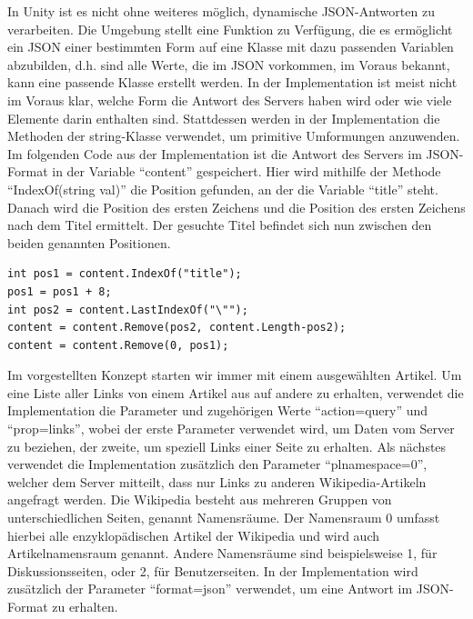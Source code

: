 \documentclass[12pt, a4paper]{article}
\begin{document}
In Unity ist es nicht ohne weiteres möglich, dynamische JSON-Antworten zu verarbeiten. Die Umgebung stellt eine Funktion zu Verfügung, die es ermöglicht ein JSON einer bestimmten Form auf eine Klasse mit dazu passenden Variablen abzubilden, d.h. sind alle Werte, die im JSON vorkommen, im Voraus bekannt, kann eine passende Klasse erstellt werden. In der Implementation ist meist nicht im Voraus klar, welche Form die Antwort des Servers haben wird oder wie viele Elemente darin enthalten sind. Stattdessen werden in der Implementation die Methoden der string-Klasse verwendet, um primitive Umformungen anzuwenden. Im folgenden Code aus der Implementation ist die Antwort des Servers im JSON-Format in der Variable "`content"' gespeichert. Hier wird mithilfe der Methode "`IndexOf(string val)"' die Position gefunden, an der die Variable "`title"' steht. Danach wird die Position des ersten Zeichens und die Position des ersten Zeichens nach dem Titel ermittelt. Der gesuchte Titel befindet sich nun zwischen den beiden genannten Positionen.
\begin{lstlisting}
int pos1 = content.IndexOf("title");
pos1 = pos1 + 8;
int pos2 = content.LastIndexOf("\"");
content = content.Remove(pos2, content.Length-pos2);
content = content.Remove(0, pos1);
\end{lstlisting}
Im vorgestellten Konzept starten wir immer mit einem ausgewählten Artikel. Um eine Liste aller Links von einem Artikel aus auf andere zu erhalten, verwendet die Implementation die Parameter und zugehörigen Werte "`action=query"' und "`prop=links"', wobei der erste Parameter verwendet wird, um Daten vom Server zu beziehen, der zweite, um speziell Links einer Seite zu erhalten. Als nächstes verwendet die Implementation zusätzlich den Parameter "`plnamespace=0"', welcher dem Server mitteilt, dass nur Links zu anderen Wikipedia-Artikeln angefragt werden. Die Wikipedia besteht aus mehreren Gruppen von unterschiedlichen Seiten, genannt Namensräume. Der Namensraum 0 umfasst hierbei alle enzyklopädischen Artikel der Wikipedia und wird auch Artikelnamensraum genannt. Andere Namensräume sind beispielsweise 1, für Diskussionsseiten, oder 2, für Benutzerseiten. In der Implementation wird zusätzlich der Parameter "`format=json"' verwendet, um eine Antwort im JSON-Format zu erhalten.\\
\end{document}
